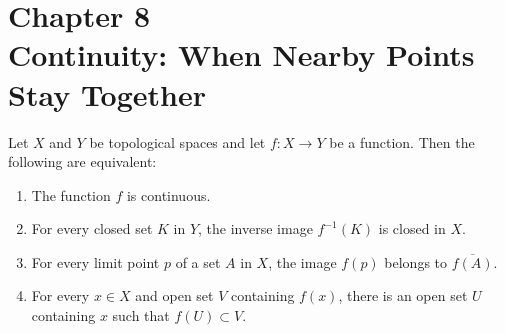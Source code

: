 \documentclass[letter,12pt,twoside]{hmcpset}
\begin{document}
\section*{Chapter 8\\ Continuity: When Nearby Points Stay Together}

\begin{problem}[Theorem 8.1] 
    Let $X$ and $Y$ be topological spaces and let $f: X \rightarrow Y$ be 
    a function. Then the following are equivalent:
    \begin{enumerate}
        \item The function $f$ is continuous.
        \item For every closed set $K$ in $Y$, the inverse image 
        $f^{-1}(K)$ is closed in $X$.
        \item For every limit point $p$ of a set $A$ in $X$, the image 
        $f(p)$ belongs to $\overline{f(A)}$.
        \item For every $x \in X$ and open set $V$ containing $f(x)$, 
        there is an open set $U$ containing $x$ such that $f(U) \subset V$.
    \end{enumerate}
\end{problem}
\end{document}
